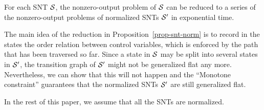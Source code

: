 \begin{proposition}\label{prop-snt-norm}
For each SNT ${\mathcal{S} }$, the nonzero-output problem of ${\mathcal{S} }$ can be reduced to a series of the nonzero-output problems of normalized SNTs ${\mathcal{S} }'$ in exponential time.
\end{proposition}

The main idea of the reduction in Proposition~\ref{prop-snt-norm} is to record in the states the order relation between control variables, which is enforced by the path that has been traversed so far. Since a state in ${\mathcal{S} }$ may be split into several states in ${\mathcal{S} }'$, the transition graph of ${\mathcal{S} }'$ might not be generalized flat any more. Nevertheless, we can show that this will not happen and the ``Monotone  constraint'' guarantees that the normalized SNTs ${\mathcal{S} }'$ are still generalized flat. 

In the rest of this paper, we assume that all the SNTs are normalized.


